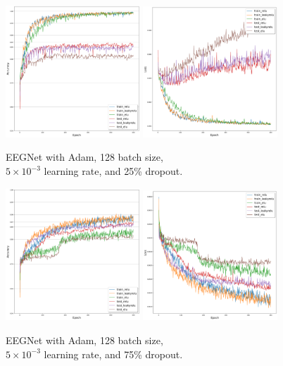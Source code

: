 	\begin{figure}[H]
	  \centering
		\includegraphics[width=0.45\textwidth]{results/eegnet_adam_128_0.005_0.25_acc.png}
		\includegraphics[width=0.45\textwidth]{results/eegnet_adam_128_0.005_0.25_loss.png}
		\caption{EEGNet with Adam, 128 batch size, \\ $5 \times 10^{-3}$ learning rate, and 25\% dropout.}
   	\end{figure}
	\begin{figure}[H]
		\centering
		\includegraphics[width=0.45\textwidth]{results/eegnet_adam_128_0.005_0.75_acc.png}
		\includegraphics[width=0.45\textwidth]{results/eegnet_adam_128_0.005_0.75_loss.png}
		\caption{EEGNet with Adam, 128 batch size, \\ $5 \times 10^{-3}$ learning rate, and 75\% dropout.}
   	\end{figure}

